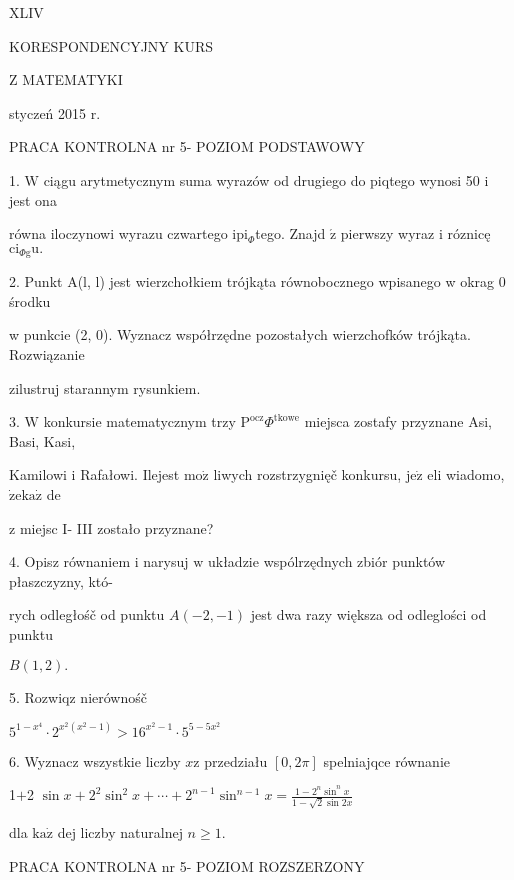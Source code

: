 \documentclass[a4paper,12pt]{article}
\begin{document}
XLIV

KORESPONDENCYJNY KURS

Z MATEMATYKI

styczeń 2015 r.

PRACA KONTROLNA nr 5- POZIOM PODSTAWOWY

1. $\mathrm{W}$ ciągu arytmetycznym suma wyrazów od drugiego do piqtego wynosi 50 $\mathrm{i}$ jest ona

równa iloczynowi wyrazu czwartego $\mathrm{i}\mathrm{p}\mathrm{i}_{\Phi}$tego. Znajd $\acute{\mathrm{z}}$ pierwszy wyraz $\mathrm{i}$ róznicę $\mathrm{c}\mathrm{i}_{\Phi \mathrm{g}}\mathrm{u}.$

2. Punkt A(l, l) jest wierzchołkiem trójkąta równobocznego wpisanego w okrag 0 środku

w punkcie (2, 0). Wyznacz współrzędne pozostałych wierzchofków trójkąta. Rozwiązanie

zilustruj starannym rysunkiem.

3. $\mathrm{W}$ konkursie matematycznym trzy $\mathrm{P}^{\mathrm{o}\mathrm{c}\mathrm{z}}\Phi^{\mathrm{t}\mathrm{k}\mathrm{o}\mathrm{w}\mathrm{e}}$ miejsca zostafy przyznane Asi, Basi, Kasi,

Kamilowi $\mathrm{i}$ Rafałowi. Ilejest $\mathrm{m}\mathrm{o}\dot{\mathrm{z}}$ liwych rozstrzygnięč konkursu, $\mathrm{j}\mathrm{e}\dot{\mathrm{z}}$ eli wiadomo, $\dot{\mathrm{z}}\mathrm{e}\mathrm{k}\mathrm{a}\dot{\mathrm{z}}$ de

$\mathrm{z}$ miejsc I- III zostało przyznane?

4. Opisz równaniem $\mathrm{i}$ narysuj $\mathrm{w}$ układzie wspólrzędnych zbiór punktów płaszczyzny, któ-

rych odległośč od punktu $A(-2,-1)$ jest dwa razy większa od odleglości od punktu

$B(1,2).$

5. Rozwiqz nierównośč

$5^{1-x^{4}}\cdot 2^{x^{2}(x^{2}-1)}>16^{x^{2}-1}\cdot 5^{5-5x^{2}}$

6. Wyznacz wszystkie liczby $x\mathrm{z}$ przedziału $[0,2\pi]$ spelniajqce równanie

1$+$2 $\displaystyle \sin x+2^{2}\sin^{2}x+\cdots+2^{n-1}\sin^{n-1}x=\frac{1-2^{n}\sin^{n}x}{1-\sqrt{2}\sin 2x}$

dla $\mathrm{k}\mathrm{a}\dot{\mathrm{z}}$ dej liczby naturalnej $n\geq 1.$




PRACA KONTROLNA nr 5- POZIOM ROZSZERZONY
\end{document}
